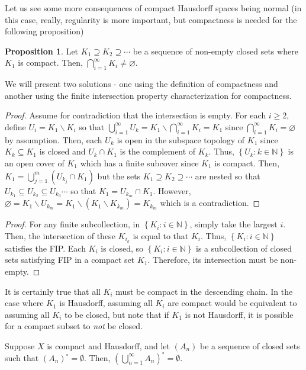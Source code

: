\documentclass[12pt,reqno]{amsart}
\numberwithin{theorem}{section}
\theoremstyle{definition}
\theoremstyle{remark}
\numberwithin{equation}{section}
\newcommand{\N}{\mathbb N}
\newcommand{\set}[1]{\left \{ #1 \right \}}
\theoremstyle{definition}
\newtheorem{prop}[theorem]{Proposition}
\begin{document}
Let us see some more consequences of compact Hausdorff spaces being normal (in this case, really, regularity is more important, but compactness is needed for the following proposition)
\begin{prop}
     Let $K_1 \supseteq K_2 \supseteq \cdots$ be a sequence of non-empty closed sets where $K_1$ is compact. Then, $\bigcap_{i=1}^\infty K_i \neq \varnothing$.
\end{prop}
We will present two solutions - one using the definition of compactness and another using the finite intersection property characterization for compactness. 
\begin{proof}
    Assume for contradiction that the intersection is empty. For each $i\geq 2$, define $U_i = K_1 \backslash K_i$ so that $\bigcup_{i=1}^\infty U_k = K_1 \backslash \bigcap_{i=1}^\infty   K_i = K_1$ since $\bigcap_{i=1}^\infty   K_i = \varnothing$ by assumption. Then, each $U_k$ is open in the subspace topology of $K_1$ since $K_k \subseteq K_1$ is closed and $U_k \cap K_1$ is the complement of $K_k$. Thus, $\set{U_k : k \in \mathbb N}$ is an open cover of $K_1$ which has a finite subcover since $K_1$ is compact. Then, $K_1 = \bigcup_{j=1}^m (U_{k_j}\cap K_1)$ but the sets $K_1 \supseteq K_2 \supseteq \cdots$ are nested so that $U_{k_1} \subseteq U_{k_2}\subseteq U_{k_3} \cdots$ so that $K_1 = U_{k_m} \cap K_1$. However, $\varnothing = K_1 \backslash U_{k_m} = K_1 \backslash (K_1 \backslash K_{k_m} ) = K_{k_m}$ which is a contradiction.
\end{proof}
\begin{proof}
    For any finite subcollection, in $\set{K_i: i \in \N}$, simply take the largest $i$. Then, the intersection of these $K_{i_k}$ is equal to that $K_i$. Thus, $\set{K_i: i \in \N}$ satisfies the FIP. Each $K_i$ is closed, so $\set{K_i: i \in \N}$ is a subcollection of closed sets satisfying FIP in a compact set $K_1$. Therefore, its intersection must be non-empty.
\end{proof}
It is certainly true that all $K_i$ must be compact in the descending chain. In the case where $K_1$ is Hausdorff, assuming all $K_i$ are compact would be equivalent to assuming all $K_i$ to be closed, but note that if $K_1$ is not Hausdorff, it is possible for a compact subset to \textit{not} be closed. 
\begin{theorem}
    Suppose $X$ is compact and Hausdorff, and let $(A_n)$ be a sequence of closed sets such that $(A_n)^\circ = \emptyset$. Then, $(\bigcup_{n=1}^\infty A_n)^\circ = \emptyset$. 
\end{theorem}
\end{document}

